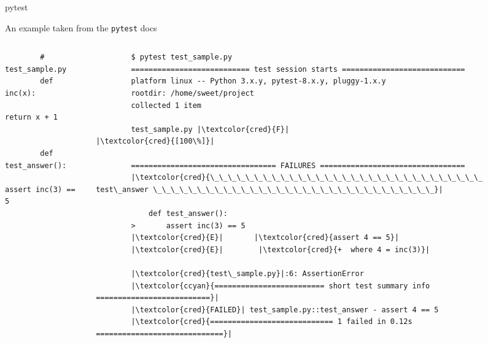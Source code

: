 \begin{darkframe}[fragile]{pytest}
  \begin{center}
    \large\textcolor{ccyan}{An example taken from the \texttt{pytest} docs}
  \end{center}
  \vspace{0.25cm}
  \begin{columns}[t,onlytextwidth]
    \begin{column}{0.28\textwidth}
      \begin{verbatim}
        # test_sample.py
        def inc(x):
            return x + 1


        def test_answer():
            assert inc(3) == 5
      \end{verbatim}
    \end{column}
    \hfill
    \begin{column}{0.68\textwidth}
      \footnotesize
      \begin{verbatim}
        $ pytest test_sample.py
        =========================== test session starts ============================
        platform linux -- Python 3.x.y, pytest-8.x.y, pluggy-1.x.y
        rootdir: /home/sweet/project
        collected 1 item

        test_sample.py |\textcolor{cred}{F}|                                                     |\textcolor{cred}{[100\%]}|

        ================================= FAILURES =================================
        |\textcolor{cred}{\_\_\_\_\_\_\_\_\_\_\_\_\_\_\_\_\_\_\_\_\_\_\_\_\_\_\_\_\_\_\_ test\_answer \_\_\_\_\_\_\_\_\_\_\_\_\_\_\_\_\_\_\_\_\_\_\_\_\_\_\_\_\_\_\_\_}|

            def test_answer():
        >       assert inc(3) == 5
        |\textcolor{cred}{E}|       |\textcolor{cred}{assert 4 == 5}|
        |\textcolor{cred}{E}|        |\textcolor{cred}{+  where 4 = inc(3)}|

        |\textcolor{cred}{test\_sample.py}|:6: AssertionError
        |\textcolor{ccyan}{========================= short test summary info ==========================}|
        |\textcolor{cred}{FAILED}| test_sample.py::test_answer - assert 4 == 5
        |\textcolor{cred}{============================ 1 failed in 0.12s =============================}|
      \end{verbatim}
    \end{column}
  \end{columns}
\end{darkframe}

